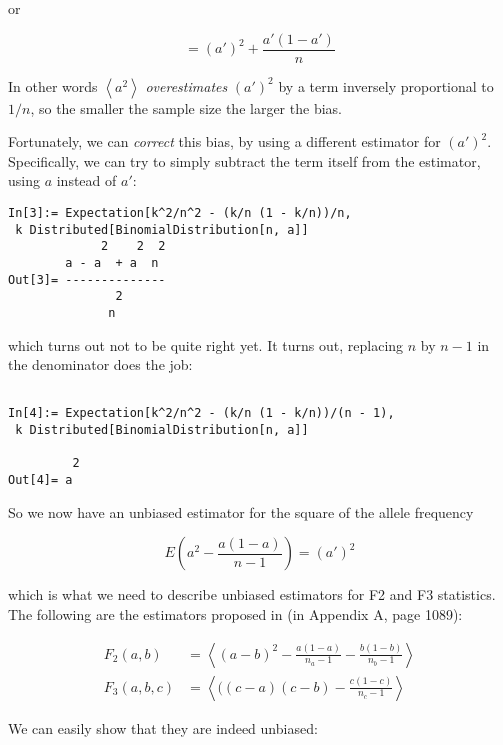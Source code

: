 \documentclass{article}
\begin{document}
or

\begin{equation}
=\left(a'\right)^2+\frac{a'(1-a')}{n}
\end{equation}

In other words \(\left\langle a^2\right\rangle\) \textit{overestimates} \((a')^2\) by a term inversely proportional to \(1/n\), so the smaller the sample size the larger the bias.

Fortunately, we can \textit{correct} this bias, by using a different estimator for \((a')^2\). Specifically, we can try to simply subtract the term itself from the estimator, using \(a\) instead of \(a'\):

\begin{lstlisting}
In[3]:= Expectation[k^2/n^2 - (k/n (1 - k/n))/n,
 k Distributed[BinomialDistribution[n, a]]   
             2    2  2
        a - a  + a  n
Out[3]= --------------
               2
              n
\end{lstlisting}

which turns out not to be quite right yet. It turns out, replacing \(n\) by \(n-1\) in the denominator does the job:

\begin{lstlisting}

In[4]:= Expectation[k^2/n^2 - (k/n (1 - k/n))/(n - 1),                          
 k Distributed[BinomialDistribution[n, a]]                                   

         2
Out[4]= a
\end{lstlisting}

So we now have an unbiased estimator for the square of the allele frequency

\begin{equation}
\label{eq_freqSquare_unbiased}
E\left( a^2-\frac{a(1-a)}{n-1}\right) =\left(a'\right)^2
\end{equation}

which is what we need to describe unbiased estimators for F2 and F3 statistics. The following are the estimators proposed in \cite{Patterson2012-yq} (in Appendix A, page 1089):

\begin{align}
F_2(a,b) &= \left\langle (a-b)^2-\frac{a(1-a)}{n_a-1}-\frac{b(1-b)}{n_b-1}\right\rangle \\
F_3(a,b,c) &= \left\langle( (c-a)(c-b)-\frac{c(1-c)}{n_c-1}\right\rangle
\end{align}

We can easily show that they are indeed unbiased:
\end{document}
